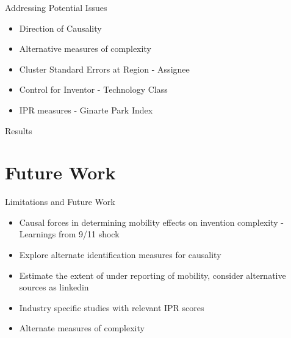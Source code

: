 \documentclass{beamer}
\begin{document}
\begin{frame}{Addressing Potential Issues}{}
\begin{itemize}
\item{Direction of Causality}
\item{Alternative measures of complexity }
\item{Cluster Standard Errors at Region - Assignee}
\item{Control for Inventor - Technology Class}
\item{IPR measures - Ginarte Park Index}
\end{itemize}
\end{frame}

\begin{frame}{Results}{}

\end{frame}

\section{Future Work}
\begin{frame}{Limitations and Future Work}{}
\begin{itemize}
\item{Causal forces in determining mobility effects on invention complexity - Learnings from 9/11 shock}
\item{Explore alternate identification measures for causality}
\item{Estimate the extent of under reporting of mobility, consider alternative sources as linkedin}
\item{Industry specific studies with relevant IPR scores}
\item{Alternate measures of complexity}
\end{itemize}
\end{frame}



\end{document}
